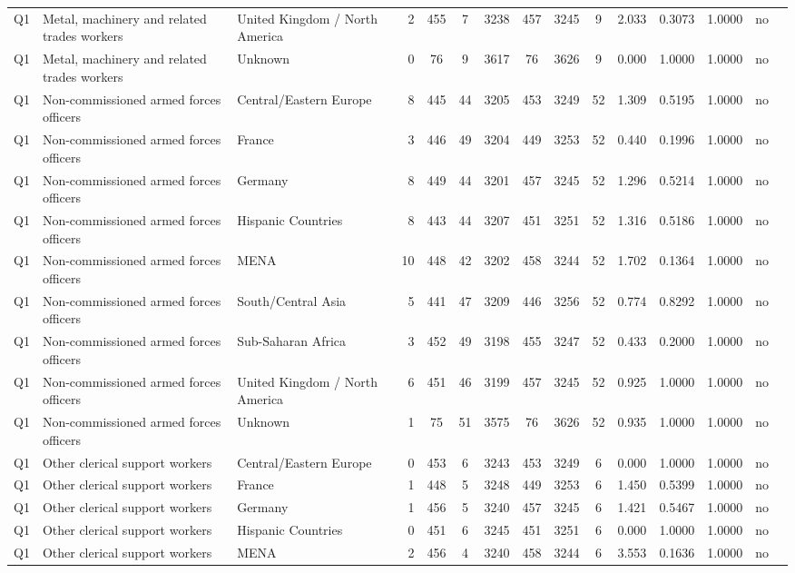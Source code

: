\begin{longtable}{lllrcccccccccll}
Q1 & Metal, machinery and related trades workers & United Kingdom / North America & 2 & 455 & 7 & 3238 & 457 & 3245 & 9 & 2.033 & 0.3073 & 1.0000 & no \\
Q1 & Metal, machinery and related trades workers & Unknown & 0 & 76 & 9 & 3617 & 76 & 3626 & 9 & 0.000 & 1.0000 & 1.0000 & no \\
Q1 & Non-commissioned armed forces officers & Central/Eastern Europe & 8 & 445 & 44 & 3205 & 453 & 3249 & 52 & 1.309 & 0.5195 & 1.0000 & no \\
Q1 & Non-commissioned armed forces officers & France & 3 & 446 & 49 & 3204 & 449 & 3253 & 52 & 0.440 & 0.1996 & 1.0000 & no \\
Q1 & Non-commissioned armed forces officers & Germany & 8 & 449 & 44 & 3201 & 457 & 3245 & 52 & 1.296 & 0.5214 & 1.0000 & no \\
Q1 & Non-commissioned armed forces officers & Hispanic Countries & 8 & 443 & 44 & 3207 & 451 & 3251 & 52 & 1.316 & 0.5186 & 1.0000 & no \\
Q1 & Non-commissioned armed forces officers & MENA & 10 & 448 & 42 & 3202 & 458 & 3244 & 52 & 1.702 & 0.1364 & 1.0000 & no \\
Q1 & Non-commissioned armed forces officers & South/Central Asia & 5 & 441 & 47 & 3209 & 446 & 3256 & 52 & 0.774 & 0.8292 & 1.0000 & no \\
Q1 & Non-commissioned armed forces officers & Sub-Saharan Africa & 3 & 452 & 49 & 3198 & 455 & 3247 & 52 & 0.433 & 0.2000 & 1.0000 & no \\
Q1 & Non-commissioned armed forces officers & United Kingdom / North America & 6 & 451 & 46 & 3199 & 457 & 3245 & 52 & 0.925 & 1.0000 & 1.0000 & no \\
Q1 & Non-commissioned armed forces officers & Unknown & 1 & 75 & 51 & 3575 & 76 & 3626 & 52 & 0.935 & 1.0000 & 1.0000 & no \\
Q1 & Other clerical support workers & Central/Eastern Europe & 0 & 453 & 6 & 3243 & 453 & 3249 & 6 & 0.000 & 1.0000 & 1.0000 & no \\
Q1 & Other clerical support workers & France & 1 & 448 & 5 & 3248 & 449 & 3253 & 6 & 1.450 & 0.5399 & 1.0000 & no \\
Q1 & Other clerical support workers & Germany & 1 & 456 & 5 & 3240 & 457 & 3245 & 6 & 1.421 & 0.5467 & 1.0000 & no \\
Q1 & Other clerical support workers & Hispanic Countries & 0 & 451 & 6 & 3245 & 451 & 3251 & 6 & 0.000 & 1.0000 & 1.0000 & no \\
Q1 & Other clerical support workers & MENA & 2 & 456 & 4 & 3240 & 458 & 3244 & 6 & 3.553 & 0.1636 & 1.0000 & no \\

\end{longtable}
